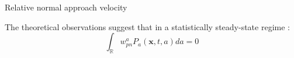 \documentclass{sintefbeamer}
\begin{document}
\begin{frame}{Relative normal approach velocity}
\begin{figure}[h!]
\end{figure}
The theoretical observations suggest that in a statistically steady-state regime :
\begin{equation}
\int_\mathbb{R} w_{pn}^aP_a(\textbf{x},t,a) da = 0 
\end{equation}

\end{frame}
\end{document}
